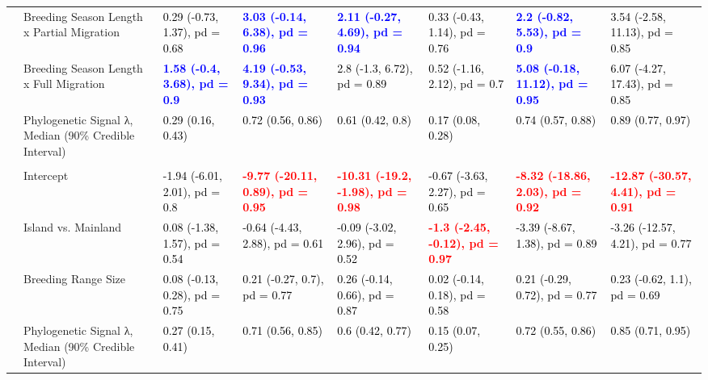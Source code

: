 \begin{landscape}
\begin{table}
{\begin{tabular}[t]{llllllll}
 & Breeding Season Length x Partial Migration & \textcolor{black}{0.29 (-0.73, 1.37), pd = 0.68} & \textcolor{blue}{\textbf{3.03 (-0.14, 6.38), pd = 0.96}} & \textcolor{blue}{\textbf{2.11 (-0.27, 4.69), pd = 0.94}} & \textcolor{black}{0.33 (-0.43, 1.14), pd = 0.76} & \textcolor{blue}{\textbf{2.2 (-0.82, 5.53), pd = 0.9}} & \textcolor{black}{3.54 (-2.58, 11.13), pd = 0.85}\\
 & Breeding Season Length x Full Migration & \textcolor{blue}{\textbf{1.58 (-0.4, 3.68), pd = 0.9}} & \textcolor{blue}{\textbf{4.19 (-0.53, 9.34), pd = 0.93}} & \textcolor{black}{2.8 (-1.3, 6.72), pd = 0.89} & \textcolor{black}{0.52 (-1.16, 2.12), pd = 0.7} & \textcolor{blue}{\textbf{5.08 (-0.18, 11.12), pd = 0.95}} & \textcolor{black}{6.07 (-4.27, 17.43), pd = 0.85}\\
 & Phylogenetic Signal λ, Median (90\% Credible Interval) & \textcolor{black}{0.29 (0.16, 0.43)} & \textcolor{black}{0.72 (0.56, 0.86)} & \textcolor{black}{0.61 (0.42, 0.8)} & \textcolor{black}{0.17 (0.08, 0.28)} & \textcolor{black}{0.74 (0.57, 0.88)} & \textcolor{black}{0.89 (0.77, 0.97)}\\
\addlinespace[0.3em]
\multicolumn{1}{l}{\textbf{Breeding Spacing}}\\
\hspace{1em} & Intercept & \textcolor{black}{-1.94 (-6.01, 2.01), pd = 0.8} & \textcolor{red}{\textbf{-9.77 (-20.11, 0.89), pd = 0.95}} & \textcolor{red}{\textbf{-10.31 (-19.2, -1.98), pd = 0.98}} & \textcolor{black}{-0.67 (-3.63, 2.27), pd = 0.65} & \textcolor{red}{\textbf{-8.32 (-18.86, 2.03), pd = 0.92}} & \textcolor{red}{\textbf{-12.87 (-30.57, 4.41), pd = 0.91}}\\
\hspace{1em} & Island vs. Mainland & \textcolor{black}{0.08 (-1.38, 1.57), pd = 0.54} & \textcolor{black}{-0.64 (-4.43, 2.88), pd = 0.61} & \textcolor{black}{-0.09 (-3.02, 2.96), pd = 0.52} & \textcolor{red}{\textbf{-1.3 (-2.45, -0.12), pd = 0.97}} & \textcolor{black}{-3.39 (-8.67, 1.38), pd = 0.89} & \textcolor{black}{-3.26 (-12.57, 4.21), pd = 0.77}\\
\hspace{1em} & Breeding Range Size & \textcolor{black}{0.08 (-0.13, 0.28), pd = 0.75} & \textcolor{black}{0.21 (-0.27, 0.7), pd = 0.77} & \textcolor{black}{0.26 (-0.14, 0.66), pd = 0.87} & \textcolor{black}{0.02 (-0.14, 0.18), pd = 0.58} & \textcolor{black}{0.21 (-0.29, 0.72), pd = 0.77} & \textcolor{black}{0.23 (-0.62, 1.1), pd = 0.69}\\
\hspace{1em} & Phylogenetic Signal λ, Median (90\% Credible Interval) & \textcolor{black}{0.27 (0.15, 0.41)} & \textcolor{black}{0.71 (0.56, 0.85)} & \textcolor{black}{0.6 (0.42, 0.77)} & \textcolor{black}{0.15 (0.07, 0.25)} & \textcolor{black}{0.72 (0.55, 0.86)} & \textcolor{black}{0.85 (0.71, 0.95)}\\

\end{tabular}}
\end{table}
\end{landscape}
